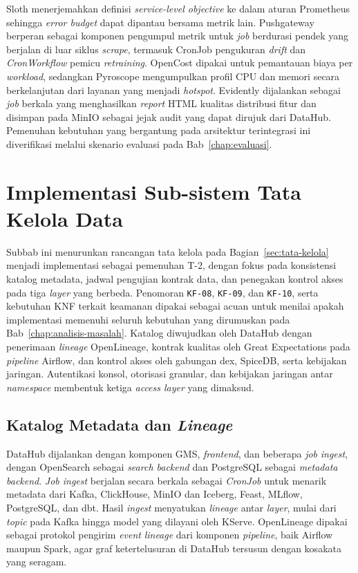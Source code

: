 Sloth \autocite{sloth2025} menerjemahkan definisi \textit{service-level objective} ke dalam aturan Prometheus sehingga \textit{error budget} dapat dipantau bersama metrik lain. Pushgateway berperan sebagai komponen pengumpul metrik untuk \textit{job} berdurasi pendek yang berjalan di luar siklus \textit{scrape}, termasuk CronJob pengukuran \textit{drift} dan \textit{CronWorkflow} pemicu \textit{retraining}. OpenCost dipakai untuk pemantauan biaya per \textit{workload}, sedangkan Pyroscope mengumpulkan profil CPU dan memori secara berkelanjutan dari layanan yang menjadi \textit{hotspot}. Evidently \autocite{evidently2025} dijalankan sebagai \textit{job} berkala yang menghasilkan \textit{report} HTML kualitas distribusi fitur dan disimpan pada MinIO sebagai jejak audit yang dapat dirujuk dari DataHub. Pemenuhan kebutuhan yang bergantung pada arsitektur terintegrasi ini diverifikasi melalui skenario evaluasi pada Bab~\ref{chap:evaluasi}.

\section{Implementasi Sub-sistem Tata Kelola Data}
\label{sec:impl-tata-kelola}

Subbab ini menurunkan rancangan tata kelola pada Bagian~\ref{sec:tata-kelola} menjadi implementasi sebagai pemenuhan T-2, dengan fokus pada konsistensi katalog metadata, jadwal pengujian kontrak data, dan penegakan kontrol akses pada tiga \textit{layer} yang berbeda. Penomoran \texttt{KF-08}, \texttt{KF-09}, dan \texttt{KF-10}, serta kebutuhan KNF terkait keamanan dipakai sebagai acuan untuk menilai apakah implementasi memenuhi seluruh kebutuhan yang dirumuskan pada Bab~\ref{chap:analisis-masalah}. Katalog diwujudkan oleh DataHub dengan penerimaan \textit{lineage} OpenLineage, kontrak kualitas oleh Great Expectations pada \textit{pipeline} Airflow, dan kontrol akses oleh gabungan dex, SpiceDB, serta kebijakan jaringan. Autentikasi konsol, otorisasi granular, dan kebijakan jaringan antar \textit{namespace} membentuk ketiga \textit{access layer} yang dimaksud.

\subsection{Katalog Metadata dan \textit{Lineage}}
\label{subsec:impl-katalog}

DataHub \autocite{datahub2024} dijalankan dengan komponen GMS, \textit{frontend}, dan beberapa \textit{job} \textit{ingest}, dengan OpenSearch sebagai \textit{search backend} dan PostgreSQL sebagai \textit{metadata backend}. \textit{Job ingest} berjalan secara berkala sebagai \textit{CronJob} untuk menarik metadata dari Kafka, ClickHouse, MinIO dan Iceberg, Feast, MLflow, PostgreSQL, dan dbt. Hasil \textit{ingest} menyatukan \textit{lineage} antar \textit{layer}, mulai dari \textit{topic} pada Kafka hingga model yang dilayani oleh KServe. OpenLineage \autocite{openlineage2025} dipakai sebagai protokol pengirim \textit{event} \textit{lineage} dari komponen \textit{pipeline}, baik Airflow maupun Spark, agar graf ketertelusuran di DataHub tersusun dengan kosakata yang seragam.

